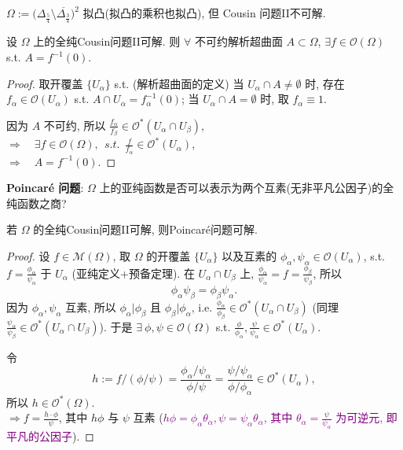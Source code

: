 \begin{example}[Oka]
  $\Omega :=\big(\Delta_{\frac{5}{4}} \setminus \overline{\Delta_{\frac{3}{4}} }\big)^2$ 拟凸(拟凸的乘积也拟凸), 但 Cousin 问题II不可解. 
\end{example}

\begin{theorem}
  设 $\Omega $ 上的全纯Cousin问题II可解. 
  则 $\forall $ 不可约解析超曲面 $A \subset \Omega $, $\exists f \in \mathcal{O}(\Omega )$ s.t. $A=f^{-1}(0)$.    
\end{theorem}
\begin{proof}
  取开覆盖 $\{U_{\alpha }\}$ s.t. (解析超曲面的定义) 当 $U_{\alpha }\cap A \neq \emptyset $ 时, 存在 $f_{\alpha }\in \mathcal{O}(U_{\alpha })$ s.t. $A \cap U_{\alpha }=f^{-1}_{\alpha }(0)$;   当 $U_{\alpha }\cap A = \emptyset $ 时, 取 $f_{\alpha } \equiv 1$.
  
  因为 $A$ 不可约, 所以 $\frac{f_{\alpha }}{f_{\beta }} \in \mathcal{O}^{*}(U_{\alpha }\cap U_{\beta })$, \\
  $\Rightarrow \quad \exists f \in \mathcal{O}(\Omega ), ~~ s.t. ~~ \frac{f}{f_{\alpha }} \in \mathcal{O}^{*}(U_{\alpha })$, \\
  $\Rightarrow \quad A=f^{-1}(0).$ 
\end{proof}

\noindent\textbf{Poincar\'e 问题}: $\Omega $ 上的亚纯函数是否可以表示为两个互素(无非平凡公因子)的全纯函数之商? 

\begin{theorem}
  若 $\Omega $ 的全纯Cousin问题II可解, 则Poincar\'e问题可解. 
\end{theorem}
\begin{proof}
  设 $f \in \mathcal{M}(\Omega )$, 取 $\Omega $ 的开覆盖 $\{U_{\alpha }\}$ 以及互素的 $\phi _{\alpha },\psi _{\alpha } \in \mathcal{O}(U_{\alpha })$, s.t. $f=\frac{\phi _{\alpha }}{\psi _{\alpha }}$ 于 $U_{\alpha }$ (亚纯定义+预备定理). 
  在 $U_{\alpha }\cap U_{\beta }$ 上, $\frac{\phi _{\alpha }}{\psi _{\alpha }}=f=\frac{\phi _{\beta }}{\psi _{\beta }}$, 所以 
  $$ \phi _{\alpha } \psi _{\beta }=\phi _{\beta } \psi _{\alpha }.$$ 
  因为 $\phi _{\alpha }, \psi _{\alpha }$ 互素,
  所以 $\phi _{\alpha }|\phi _{\beta }$ 且 $\phi _{\beta }|\phi _{\alpha }$, i.e. $\frac{\phi _{\alpha }}{\phi _{\beta }} \in \mathcal{O}^{*}(U_{\alpha }\cap U_{\beta })$ (同理$\frac{\psi _{\alpha }}{\psi _{\beta }} \in \mathcal{O}^{*}(U_{\alpha }\cap U_{\beta })$). 于是
  $ \exists~ \phi ,\psi \in \mathcal{O}(\Omega )$ s.t. $\frac{\phi }{\phi _{\alpha }},\frac{\psi }{\psi _{\alpha }} \in \mathcal{O}^{*}(U_{\alpha })$.  

  令 
  $$h:=f/(\phi /\psi )=\frac{\phi _{\alpha }/\psi _{\alpha }}{\phi /\psi }=\frac{\psi /\psi _{\alpha }}{\phi /\phi _{\alpha }} \in \mathcal{O}^{*}(U_{\alpha }),$$ 
  所以 $h \in \mathcal{O}^{*}(\Omega )$. \\
  $\Rightarrow f= \frac{h \cdot \phi }{\psi }$, 其中 $h \phi $ 与 $\psi $ 互素 (\textcolor{purple}{$h \phi = \phi _{\alpha }\theta _{\alpha }, \psi =\psi _{\alpha } \theta _{\alpha }$, 其中 $\theta _{\alpha }=\frac{\psi }{\psi _{\alpha }}$ 为可逆元, 即平凡的公因子}).   
\end{proof}

